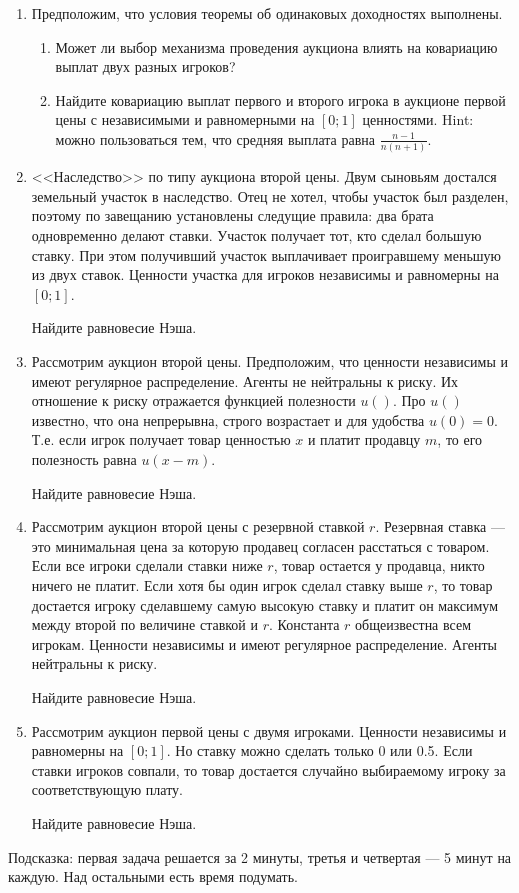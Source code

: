 \documentclass[pdftex,12pt,a4paper]{article}
\begin{document}
\begin{enumerate}
\item Предположим, что условия теоремы об одинаковых доходностях выполнены. 
\begin{enumerate}
\item Может ли выбор механизма проведения аукциона влиять на ковариацию выплат двух разных игроков?
\item  Найдите ковариацию выплат первого и второго игрока в аукционе первой цены с независимыми и равномерными на $ [0;1] $ ценностями. Hint: можно пользоваться тем, что средняя выплата равна $ \frac{n-1}{n(n+1)} $.
\end{enumerate}


\item <<Наследство>> по типу аукциона второй цены. Двум сыновьям достался земельный участок в наследство. Отец не хотел, чтобы участок был разделен, поэтому по завещанию установлены следущие правила: два брата одновременно делают ставки. Участок получает тот, кто сделал большую ставку. При этом получивший участок выплачивает проигравшему меньшую из двух ставок. Ценности участка для игроков независимы и равномерны на $ [0;1] $. 

Найдите равновесие Нэша.

\item Рассмотрим аукцион второй цены. Предположим, что ценности независимы и имеют регулярное распределение. Агенты не нейтральны к риску. Их отношение к риску отражается функцией полезности $ u() $. Про $ u() $ известно, что она непрерывна, строго возрастает и для удобства $ u(0)=0 $. Т.е. если игрок получает товар ценностью $ x $ и платит продавцу $ m $, то его полезность равна $ u(x-m) $. 

Найдите равновесие Нэша.



\item Рассмотрим аукцион второй цены с резервной ставкой $ r $. Резервная ставка --- это минимальная цена за которую продавец согласен расстаться с товаром. Если все игроки сделали ставки ниже $ r $, товар остается у продавца, никто ничего не платит. Если хотя бы один игрок сделал ставку выше $ r $, то товар достается игроку сделавшему самую высокую ставку и платит он максимум между второй по величине ставкой и $ r $. Константа $ r $ общеизвестна всем игрокам. Ценности независимы и имеют регулярное распределение. Агенты нейтральны к риску. 

Найдите равновесие Нэша.

\item Рассмотрим аукцион первой цены с двумя игроками. Ценности независимы и равномерны на $ [0;1] $. Но ставку можно сделать только 0 или 0.5. Если ставки игроков совпали, то товар достается случайно выбираемому игроку за соответствующую плату. 

Найдите равновесие Нэша.

\end{enumerate}

Подсказка: первая задача решается за 2 минуты, третья и четвертая --- 5 минут на каждую. Над остальными есть время подумать.



\printindex %
\end{document}
